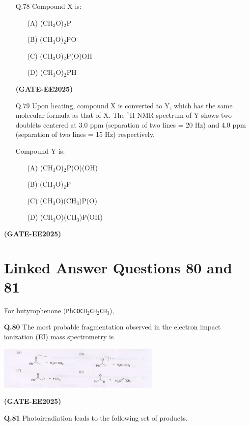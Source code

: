 \documentclass[12pt]{article}
\begin{document}
\begin{enumerate}
\begin{itemize}
    \item[Q.78] Compound X is:
    \begin{enumerate}
        \item[(A)] (CH$_3$O)$_2$P
        \item[(B)] (CH$_3$O)$_2$PO
        \item[(C)] (CH$_3$O)$_2$P(O)OH
        \item[(D)] (CH$_3$O)$_2$PH
    \end{enumerate}   \textbf{(GATE-EE2025)}


    \item[Q.79] Upon heating, compound X is converted to Y, which has the same molecular formula as that of X. The $^1$H NMR spectrum of Y shows two doublets centered at 3.0 ppm (separation of two lines = 20 Hz) and 4.0 ppm (separation of two lines = 15 Hz) respectively.

    Compound Y is:
    \begin{enumerate}
        \item[(A)] (CH$_3$O)$_2$P(O)(OH)
        \item[(B)] (CH$_3$O)$_2$P
        \item[(C)] (CH$_3$O)(CH$_3$)P(O)
        \item[(D)] (CH$_3$O)(CH$_3$)P(OH)
    \end{enumerate}
\end{itemize}   \textbf{(GATE-EE2025)}


\section*{Linked Answer Questions 80 and 81}

For butyrophenone (\texttt{PhCOCH\(_2\)CH\(_2\)CH\(_3\)}),

\textbf{Q.80} \quad The most probable fragmentation observed in the electron impact ionization (EI) mass spectrometry is

\begin{center}
\includegraphics[width=0.6\textwidth]{figs/q80.png}
\end{center}   \textbf{(GATE-EE2025)}


\textbf{Q.81} \quad Photoirradiation leads to the following set of products.


\end{enumerate}
\end{document}
